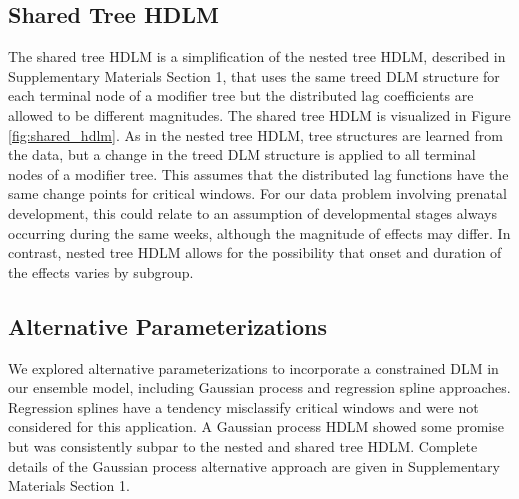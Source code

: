 \documentclass[12pt]{article}
\begin{document}
\subsection{Shared Tree HDLM}\label{sec:shared_tree_hdlm}

The shared tree HDLM is a simplification of the nested tree HDLM, described in Supplementary Materials Section 1, that uses the same treed DLM structure for each terminal node of a modifier tree but the distributed lag coefficients are allowed to be different magnitudes. The shared tree HDLM is visualized in Figure \ref{fig:shared_hdlm}. As in the nested tree HDLM, tree structures are learned from the data, but a change in the treed DLM structure is applied to all terminal nodes of a modifier tree. This assumes that the distributed lag functions have the same change points for critical windows. For our data problem involving prenatal development, this could relate to an assumption of developmental stages always occurring during the same weeks, although the magnitude of effects may differ. In contrast, nested tree HDLM allows for the possibility that onset and duration of the effects varies by subgroup.


\subsection{Alternative Parameterizations}\label{sec:gp_hdlm}
We explored alternative parameterizations to incorporate a constrained DLM in our ensemble model, including Gaussian process and regression spline approaches. Regression splines have a tendency misclassify critical windows and were not considered for this application. A Gaussian process HDLM showed some promise but was consistently subpar to the nested and shared tree HDLM. Complete details of the Gaussian process alternative approach are given in Supplementary Materials Section 1.
\end{document}
